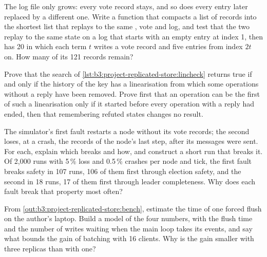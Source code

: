 \begin{exercise}[$\star\star$]\label{exo:b3:project-replicated-store:9}
The log file only grows: every vote record stays, and so does every entry later replaced by a different one. Write a function that compacts a list of records into the shortest list that replays to the same , vote and log, and test that the two replay to the same state on a log that starts with an empty entry at index 1, then has 20  in which each term $t$ writes a vote record and five entries from index $2t$ on. How many of its 121 records remain?
\end{exercise}

\begin{exercise}[$\star\star\star$]\label{exo:b3:project-replicated-store:10}
Prove that the search of \cref{lst:b3:project-replicated-store:lincheck} returns true if and only if the history of the key has a linearisation from which some operations without a reply have been removed. Prove first that an operation can be the first of such a linearisation only if it started before every operation with a reply had ended, then that remembering refuted states changes no result.
\end{exercise}

\begin{exercise}[$\star\star\star$]\label{exo:b3:project-replicated-store:11}
The simulator's first fault restarts a node without its vote records; the second loses, at a crash, the records of the node's last step, after its messages were sent. For each, explain which  breaks and how, and construct a short run that breaks it. Of 2,000 runs with 5\,\% loss and 0.5\,\% crashes per node and tick, the first fault breaks safety in 107 runs, 106 of them first through election safety, and the second in 18 runs, 17 of them first through leader completeness. Why does each fault break that property most often?
\end{exercise}

\begin{exercise}[$\star\star\star$]\label{exo:b3:project-replicated-store:12}
From \cref{out:b3:project-replicated-store:bench}, estimate the time of one forced flush on the author's laptop. Build a model of the four numbers, with the flush time and the number of writes waiting when the main loop takes its events, and say what bounds the gain of batching with 16 clients. Why is the gain smaller with three replicas than with one?
\end{exercise}

